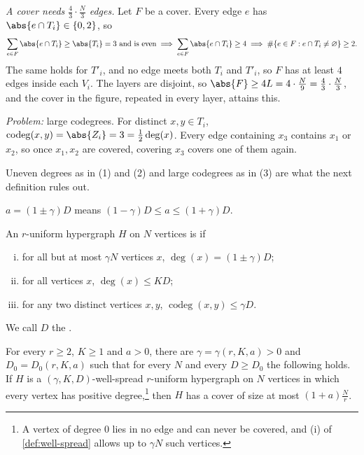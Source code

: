 \begin{eg}
\begin{enumerate}[(1)]
        \emph{A cover needs \(\frac{4}{3} \cdot \frac{N}{3}\) edges.} Let \(F\) be a cover. Every edge \(e\) has \(\abs{e \cap T_i} \in \{0, 2\}\), so
        \[
            \sum_{e \in F} \abs{e \cap T_i} \ge \abs{T_i} = 3
            \text{ and is even}
            \;\Longrightarrow\;
            \sum_{e \in F} \abs{e \cap T_i} \ge 4
            \;\Longrightarrow\;
            \#\{ e \in F : e \cap T_i \ne \varnothing \} \ge 2 .
        \]
        The same holds for \(T'_i\), and no edge meets both \(T_i\) and \(T'_i\), so \(F\) has at least \(4\) edges inside each \(V_i\). The layers are disjoint, so \(\abs{F} \ge 4L = 4 \cdot \frac{N}{9} = \frac{4}{3} \cdot \frac{N}{3}\), and the cover in the figure, repeated in every layer, attains this.

        \emph{Problem:} large codegrees. For distinct \(x, y \in T_i\), \(\operatorname{codeg}(x, y) = \abs{Z_i} = 3 = \frac{1}{2}\deg(x)\). Every edge containing \(x_3\) contains \(x_1\) or \(x_2\), so once \(x_1, x_2\) are covered, covering \(x_3\) covers one of them again.
    \end{enumerate}
\end{eg}

Uneven degrees as in (1) and (2) and large codegrees as in (3) are what the next definition rules out.

\begin{notation}
    \(a = (1 \pm \gamma) D\) means \((1 - \gamma) D \le a \le (1 + \gamma) D\).
\end{notation}

\begin{definition}\label{def:well-spread}
    An \(r\)-uniform hypergraph \(H\) on \(N\) vertices is  if
    \begin{enumerate}[(i)]
        \item for all but at most \(\gamma N\) vertices \(x\), \(\deg(x) = (1 \pm \gamma) D\);
        \item for all vertices \(x\), \(\deg(x) \le K D\);
        \item for any two distinct vertices \(x, y\), \(\operatorname{codeg}(x,y) \le \gamma D\).
    \end{enumerate}
    We call \(D\) the .
\end{definition}

\begin{theorem}[Pippenger]\label{thm:pippenger}
    For every \(r \ge 2\), \(K \ge 1\) and \(a > 0\), there are \(\gamma = \gamma(r,K,a) > 0\) and \(D_0 = D_0(r,K,a)\) such that for every \(N\) and every \(D \ge D_0\) the following holds. If \(H\) is a \((\gamma, K, D)\)-well-spread \(r\)-uniform hypergraph on \(N\) vertices in which every vertex has positive degree,\footnote{A vertex of degree \(0\) lies in no edge and can never be covered, and (i) of \autoref{def:well-spread} allows up to \(\gamma N\) such vertices.} then \(H\) has a cover of size at most \((1 + a) \frac{N}{r}\).
\end{theorem}

